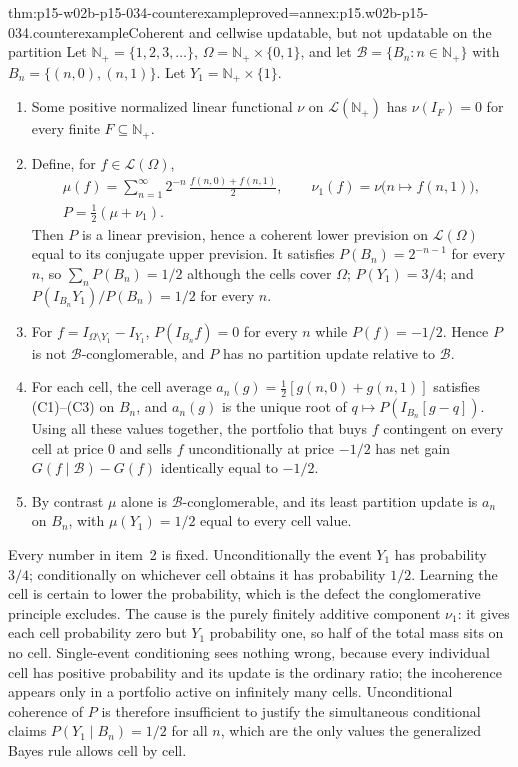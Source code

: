 \begin{hbtheorem}{thm:p15-w02b-p15-034-counterexample}{proved=annex:p15.w02b-p15-034.counterexample}{Coherent and cellwise updatable, but not updatable on the partition}
Let \(\mathbb N_+=\{1,2,3,\ldots\}\),
\(\Omega=\mathbb N_+\times\{0,1\}\), and let
\(\mathcal B=\{B_n:n\in\mathbb N_+\}\) with
\(B_n=\{(n,0),(n,1)\}\). Let \(Y_1=\mathbb N_+\times\{1\}\).
\begin{enumerate}
\item Some positive normalized linear functional \(\nu\)
on \(\mathcal L(\mathbb N_+)\) has \(\nu(I_F)=0\) for every finite
\(F\subseteq\mathbb N_+\).
\item Define, for \(f\in\mathcal L(\Omega)\),
\[
\begin{gathered}
 \mu(f)=\sum_{n=1}^\infty2^{-n}\,\frac{f(n,0)+f(n,1)}2,\qquad
 \nu_1(f)=\nu\bigl(n\mapsto f(n,1)\bigr),\\
 P=\tfrac12(\mu+\nu_1).
\end{gathered}
\]
Then \(P\) is a linear prevision, hence a coherent lower prevision on
\(\mathcal L(\Omega)\) equal to its conjugate upper prevision. It satisfies
\(P(B_n)=2^{-n-1}\) for every \(n\), so
\(\sum_nP(B_n)=1/2\) although the cells cover \(\Omega\);
\(P(Y_1)=3/4\); and \(P(I_{B_n}Y_1)/P(B_n)=1/2\) for every \(n\).
\item For \(f=I_{\Omega\setminus Y_1}-I_{Y_1}\),
\(P(I_{B_n}f)=0\) for every \(n\) while \(P(f)=-1/2\). Hence \(P\) is
not \(\mathcal B\)-conglomerable, and \(P\) has no partition update
relative to \(\mathcal B\).
\item For each cell, the cell average
\(a_n(g)=\tfrac12[g(n,0)+g(n,1)]\) satisfies (C1)--(C3) on \(B_n\),
and \(a_n(g)\) is the unique root of
\(q\mapsto P(I_{B_n}[g-q])\). Using all these values together,
the portfolio that buys \(f\) contingent on every cell at price \(0\)
and sells \(f\) unconditionally at price \(-1/2\) has net gain
\(G(f\mid\mathcal B)-G(f)\) identically equal to \(-1/2\).
\item By contrast \(\mu\) alone is \(\mathcal B\)-conglomerable, and its
least partition update is \(a_n\) on \(B_n\), with
\(\mu(Y_1)=1/2\) equal to every cell value.
\end{enumerate}
\end{hbtheorem}

Every number in item~2 is fixed. Unconditionally the event \(Y_1\) has
probability \(3/4\); conditionally on whichever cell obtains it has
probability \(1/2\). Learning the cell is certain to lower the
probability, which is the defect the conglomerative principle excludes. The
cause is the purely finitely additive component \(\nu_1\): it gives each
cell probability zero but \(Y_1\) probability one, so half of the total
mass sits on no cell. Single-event conditioning sees nothing wrong, because
every individual cell has positive probability and its update is the
ordinary ratio; the incoherence appears only in a portfolio active on
infinitely many cells. Unconditional coherence of \(P\) is therefore
insufficient to justify the simultaneous conditional claims
\(P(Y_1\mid B_n)=1/2\) for all \(n\), which are the only values the
generalized Bayes rule allows cell by cell.

